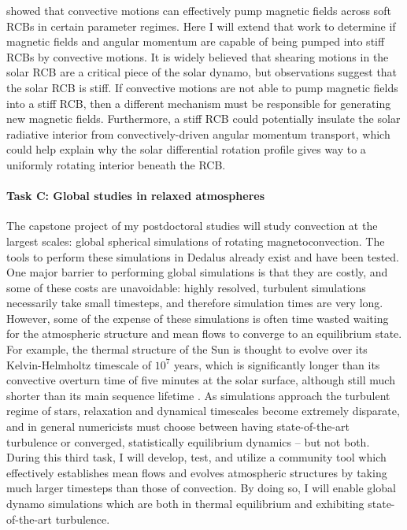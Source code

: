 \documentclass[11pt, preprint]{aastex}
\begin{document}
\citet{tobias&all1998} showed that convective motions can effectively pump magnetic fields across soft RCBs in certain parameter regimes.
Here I will extend that work  to determine if magnetic fields and angular momentum are capable of being pumped into stiff RCBs by convective motions.
It is widely believed that shearing motions in the solar RCB are a critical piece of the solar dynamo, but observations \citep{basu1997} suggest that the solar RCB is stiff.
If convective motions are not able to pump magnetic fields into a stiff RCB, then a different mechanism must be responsible for generating new magnetic fields.
Furthermore, a stiff RCB could potentially insulate the solar radiative interior from convectively-driven angular momentum transport, which could help explain why the solar differential rotation profile gives way to a uniformly rotating interior beneath the RCB.

\paragraph{Task C: Global studies in relaxed atmospheres}
\label{sct:taskC}
The capstone project of my postdoctoral studies will study convection at the largest scales: global spherical simulations of rotating magnetoconvection.
The tools to perform these simulations in Dedalus already exist \citep{lecoanet&all2018} and have been tested.
One major barrier to performing global simulations is that they are costly, and some of these costs are unavoidable: highly resolved, turbulent simulations necessarily take small timesteps, and therefore simulation times are very long.
However, some of the expense of these simulations is often time wasted waiting for the atmospheric structure and mean flows to converge to an equilibrium state.
For example, the thermal structure of the Sun is thought to evolve over its Kelvin-Helmholtz timescale of $10^7$ years, which is significantly longer than its convective overturn time of five minutes at the solar surface, although still much shorter than its main sequence lifetime \citep{anders&all2018}.
As simulations approach the turbulent regime of stars, relaxation and dynamical timescales become extremely disparate, and in general numericists must choose between having state-of-the-art turbulence or converged, statistically equilibrium dynamics -- but not both.
During this third task, I will develop, test, and utilize a community tool which effectively establishes mean flows and evolves atmospheric structures by taking much larger timesteps than those of convection.
By doing so, I will enable global dynamo simulations which are both in thermal equilibrium and exhibiting state-of-the-art turbulence.
\end{document}
